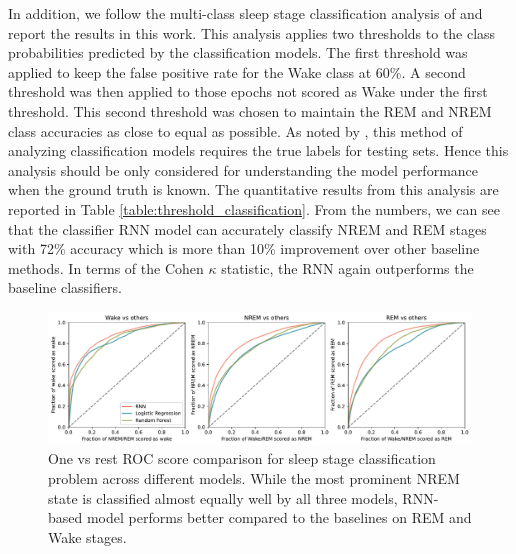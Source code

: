 \documentclass[12pt]{article}
\begin{document}
In addition, we follow the multi-class sleep stage classification analysis of \citep{walch2019} and report the results in this work. This analysis applies two thresholds to the class probabilities predicted by the classification models. The first threshold was applied to keep the false positive rate for the Wake class at 60\%. A second threshold was then applied to those epochs not scored as Wake under the first threshold. This second threshold was chosen to maintain the REM and NREM class accuracies as close to equal as possible. As noted by \citep{walch2019}, this method of analyzing classification models requires the
true labels for testing sets. Hence this analysis should 
be only considered for understanding the model performance
when the ground truth is known. The quantitative results from this analysis are reported in Table \ref{table:threshold_classification}. From the numbers, we can see that the classifier RNN model can accurately classify NREM and REM stages with 72\% accuracy which is more than 10\% improvement over other baseline methods. In terms of the Cohen $\kappa$ statistic, the RNN again outperforms the baseline classifiers. 

 
\begin{table}[t]
\centering
\caption{Classification metrics for test subjects based on binary search. The best values bolded. ($\uparrow$): higher is better, ($\downarrow$) lower is better}
\label{table:threshold_classification}
\end{table}

\begin{figure}
\centering
\includegraphics[width=\textwidth]{figures/one_vs_rest_roc_comparison.pdf}
\caption{One vs rest ROC score comparison  for sleep stage classification problem across different models. While the most prominent NREM state is classified almost equally well by all three models, RNN-based model performs better compared to the baselines on REM and Wake stages.}
\label{fig:one_vs_rest_roc_comparison}
\end{figure}
\end{document}
